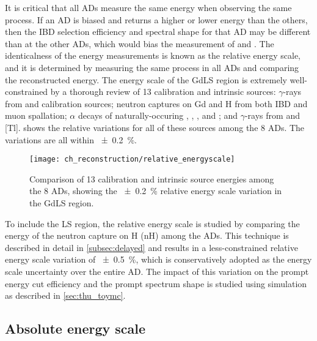 It is critical that all ADs measure the same energy when observing the same process.
If an AD is biased and returns a higher or lower energy than the others,
then the IBD selection efficiency and spectral shape for that AD
may be different than at the other ADs,
which would bias the measurement of \thetaot{} and \dmee{}.
The identicalness of the energy measurements is known as the relative energy scale,
and it is determined by measuring the same process in all ADs and comparing
the reconstructed energy.
The energy scale of the GdLS region is extremely well-constrained
by a thorough review of 13 calibration and intrinsic sources:
$\gamma$-rays from  and  calibration sources;
neutron captures on Gd and H from both IBD and muon spallation;
$\alpha$ decays of naturally-occuring ,
, , and ;
and $\gamma$-rays from  and [Tl].
 shows the relative variations
for all of these sources among the 8 ADs.
The variations are all within \SI{+-0.2}{\percent}.

\begin{figure}
    \centering
    \texttt{[image: ch\_reconstruction/relative\_energyscale]}
    \caption{
        Comparison of 13 calibration and intrinsic source energies
        among the 8 ADs, showing the \SI{+-0.2}{\percent}
        relative energy scale variation in the GdLS region.
    }
    \label{fig:gdls_rel_energyscale}
\end{figure}

To include the LS region, the relative energy scale is studied
by comparing the energy of the neutron capture on H (nH)
among the ADs.
This technique is described in detail in \cref{subsec:delayed}
and results in a less-constrained relative energy scale variation
of \SI{+-0.5}{\percent}, which is conservatively adopted
as the energy scale uncertainty over the entire AD.
The impact of this variation on the prompt energy cut efficiency
and the prompt spectrum shape
is studied using simulation
as described in \cref{sec:thu_toymc}.

\subsection{Absolute energy scale}
\label{subsec:abs_energyscale}

